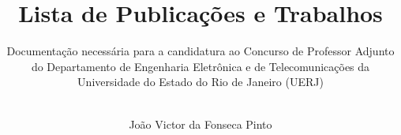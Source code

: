 \documentclass[a4paper,11pt]{article}
\title{Lista de Publicações e Trabalhos}
\author[]{Documentação necessária para a candidatura ao Concurso de Professor Adjunto do Departamento de Engenharia Eletrônica e de Telecomunicações da Universidade do Estado do Rio de Janeiro (UERJ)\\}
\author[]{\\João Victor da Fonseca Pinto}
\begin{document}
\maketitle
\flushbottom
\newpage
%
%
%
%
%
%
%

\end{document}

